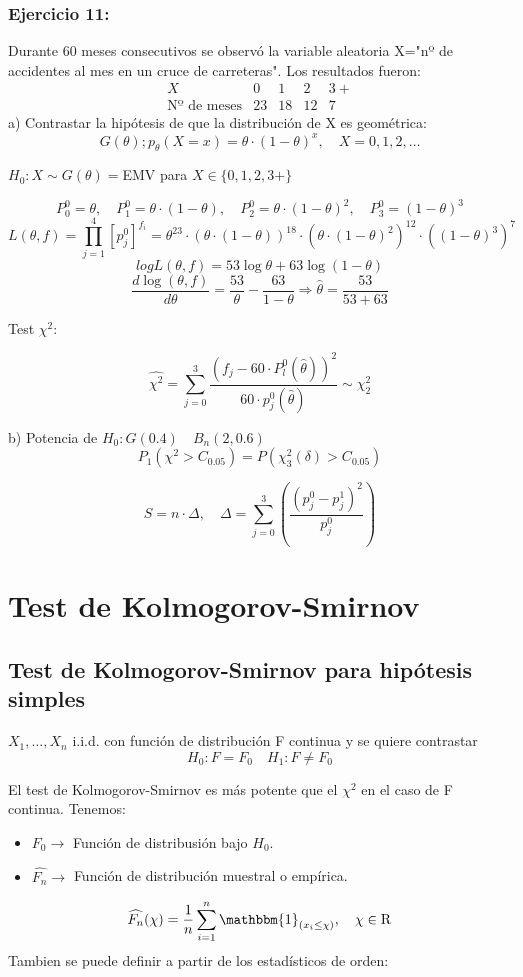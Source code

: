 \newpage
\subsubsection*{Ejercicio 11:}  
Durante 60 meses consecutivos se observó la variable aleatoria X="nº de accidentes al mes en un cruce de carreteras". Los resultados fueron:
\[
\begin{matrix}
    X & 0 & 1&2& 3+ \\
    \text{Nº de meses} & 23 & 18 & 12 & 7
\end{matrix}
\]
a) Contrastar la hipótesis de que la distribución de X es geométrica: 
\[
G(\theta);p_\theta(X=x)=\theta \cdot (1- \theta)^x, \quad X=0,1,2,\dots
\]

$H_0: X \sim G(\theta)=$EMV para $X \in \{0,1,2,3+\}$

\[
P_0^0=\theta, \quad P_1^0=\theta \cdot (1-\theta), \quad P_2^0=\theta \cdot (1-\theta)^2, \quad P_3^0=(1-\theta)^3
\]
\[
L(\theta,f)=\prod_{j=1}^{4}[p_j^0]^{f_i}= \theta^{23}\cdot(\theta \cdot (1-\theta))^18 \cdot (\theta \cdot (1-\theta)^2)^12 \cdot ((1-\theta)^3)^7
\]
\[
log L(\theta,f)=53 \log \theta+63 \log (1-\theta)
\]
\[
\frac{d \log(\theta,f)}{d \theta}=\frac{53}{\theta}-\frac{63}{1-\theta} \Longrightarrow \widehat{\theta}=\frac{53}{53+63}
\]

Test $\chi^2$:

\[
\widehat{\chi^2}=\sum_{j=0}^{3} \frac{(f_j-60\cdot P_l^0(\widehat{\theta}))^2}{60 \cdot p_j^0(\widehat{\theta})} \sim \chi^2_2
\]

b) Potencia de $H_0:G(0.4) \quad B_n(2,0.6)$
\[
P_1(\chi^2> C_{0.05})=P(\chi_3^2(\delta)>C_{0.05})
\]

\[
S=n \cdot \Delta, \quad \Delta=\sum_{j=0}^{3} \left(\frac{(p_j^0-p_j^1)^2}{p_j^0}\right)
\]
\newpage
\section{Test de Kolmogorov-Smirnov}
\subsection{Test de Kolmogorov-Smirnov para hipótesis simples}

$X_1,\dots, X_n$ i.i.d. con función de distribución F continua y se quiere contrastar
\[
H_0: F=F_0 \quad H_1: F \neq F_0
\]

El test de Kolmogorov-Smirnov es más potente que el $\chi^2$ en el caso de F continua.
Tenemos:
\begin{itemize}
    \item $F_0 \to $ Función de distribusión bajo $H_0$.
    \item $\widehat{F_n} \to$ Función de distribución muestral o empírica.
\end{itemize}
\[
\widehat{F_n}(\chi)=\frac{1}{n} \sum_{i=1}^{n} \mathbbm{1}_{(x_i \leq \chi)}, \quad \chi \in \mathrm{R}
\]
Tambien se puede definir a partir de los estadísticos de orden:

